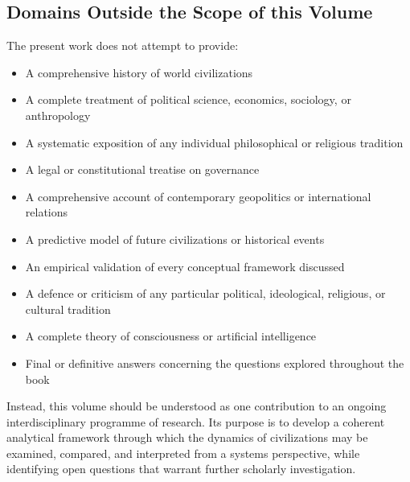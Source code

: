 \subsection*{Domains Outside the Scope of this Volume}

The present work does not attempt to provide:

\begin{itemize}
	\item A comprehensive history of world civilizations
	\item A complete treatment of political science, economics, sociology, or anthropology
	\item A systematic exposition of any individual philosophical or religious tradition
	\item A legal or constitutional treatise on governance
	\item A comprehensive account of contemporary geopolitics or international relations
	\item A predictive model of future civilizations or historical events
	\item An empirical validation of every conceptual framework discussed
	\item A defence or criticism of any particular political, ideological, religious, or cultural tradition
	\item A complete theory of consciousness or artificial intelligence
	\item Final or definitive answers concerning the questions explored throughout the book
\end{itemize}

Instead, this volume should be understood as one contribution to an ongoing interdisciplinary programme of research. Its purpose is to develop a coherent analytical framework through which the dynamics of civilizations may be examined, compared, and interpreted from a systems perspective, while identifying open questions that warrant further scholarly investigation.